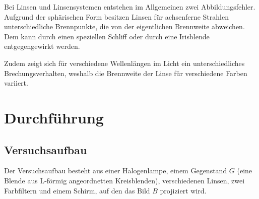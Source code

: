 \documentclass[
  parskip=half,
  bibliography=totoc,     %
  captions=tableheading,  %
  titlepage=firstiscover, %
]{scrartcl}
\begin{document}
\noindent
Bei Linsen und Linsensystemen entstehen im Allgemeinen zwei Abbildungsfehler.
Aufgrund der sphärischen Form besitzen Linsen für achsenferne Strahlen
unterschiedliche Brennpunkte, die von der eigentlichen Brennweite abweichen.
Dem kann durch einen speziellen Schliff oder durch eine Irisblende entgegengewirkt
werden.

\noindent
Zudem zeigt sich für verschiedene Wellenlängen im Licht ein unterschiedliches
Brechungsverhalten, weshalb die Brennweite der Linse für verschiedene Farben
variiert.
\clearpage
\section{Durchführung}
\subsection{Versuchsaufbau}
Der Versuchsaufbau besteht aus einer Halogenlampe, einem Gegenstand $G$ (eine
Blende aus L-förmig angeordnetten Kreisblenden), verschiedenen Linsen, zwei
Farbfiltern und einem Schirm, auf den das Bild $B$ projiziert wird.
\end{document}
